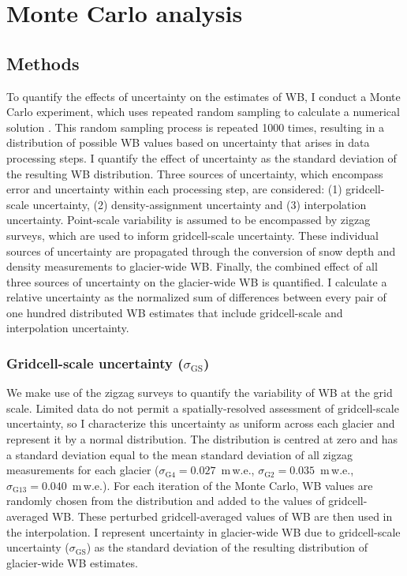 \documentclass{sfuthesis}
\begin{document}


\section{Monte Carlo analysis}
\label{sec:Unc_methods}

\subsection{Methods}
To quantify the effects of uncertainty on the estimates of WB, I conduct a Monte Carlo experiment, which uses repeated random sampling to calculate a numerical solution \citep{Metropolis1949}. This random sampling process is repeated 1000 times, resulting in a distribution of possible WB values based on uncertainty that arises in data processing steps. I quantify the effect of uncertainty as the standard deviation of the resulting WB distribution. Three sources of uncertainty, which encompass error and uncertainty within each processing step, are considered: (1) gridcell-scale uncertainty, (2) density-assignment uncertainty and (3) interpolation uncertainty. Point-scale variability is assumed to be encompassed by zigzag surveys, which are used to inform gridcell-scale uncertainty. These individual sources of uncertainty are propagated through the conversion of snow depth and density measurements to glacier-wide WB. Finally, the combined effect of all three sources of uncertainty on the glacier-wide WB is quantified. I calculate a relative uncertainty as the normalized sum of differences between every pair of one hundred distributed WB estimates that include gridcell-scale and interpolation uncertainty.

\subsubsection{Gridcell-scale uncertainty ($\sigma_{\mathrm{GS}}$)}
We make use of the zigzag surveys to quantify the variability of WB at the grid scale. Limited data do not permit a spatially-resolved assessment of gridcell-scale uncertainty, so I characterize this uncertainty as uniform across each glacier and represent it by a normal distribution. The distribution is centred at zero and has a standard deviation equal to the mean standard deviation of all zigzag measurements for each glacier ($\sigma_{\mathrm{G4}} = 0.027 $ \,m\,w.e., $\sigma_{\mathrm{G2}} = 0.035$ \,m\,w.e., $\sigma_{\mathrm{G13}} = 0.040 $ \,m\,w.e.). For each iteration of the Monte Carlo, WB values are randomly chosen from the distribution and added to the values of gridcell-averaged WB. These perturbed gridcell-averaged values of WB are then used in the interpolation. I represent uncertainty in glacier-wide WB due to gridcell-scale uncertainty ($\sigma_{\mathrm{GS}}$) as the standard deviation of the resulting distribution of glacier-wide WB estimates.  
\end{document}
